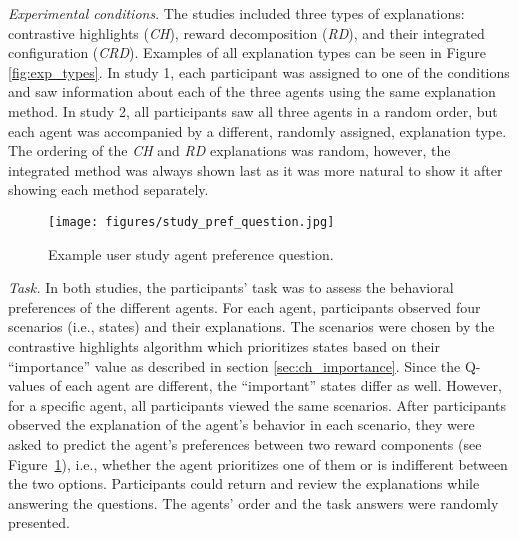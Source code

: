 \documentclass{ecai}
\begin{document}
\emph{Experimental conditions}. The studies included three types of explanations:  contrastive highlights (\textit{CH}), reward decomposition (\textit{RD}), and their integrated configuration (\textit{CRD}). Examples of all explanation types can be seen in Figure \ref{fig:exp_types}. In study 1, each participant was assigned to one of the conditions and saw information about each of the three agents using the same explanation method. 
In study 2, all participants saw all three agents in a random order, but each agent was accompanied by a different, randomly assigned, explanation type. The ordering of the \textit{CH} and \textit{RD} explanations was random, however, the integrated method was always shown last as it was more natural to show it after showing each method separately.

\begin{figure}[t]
\centering
\texttt{[image: figures/study\_pref\_question.jpg]}
\caption{Example user study agent preference question.}
\label{fig:study_pref_question}
\end{figure}


\emph{Task.} 
In both studies, the participants' task was to assess the behavioral preferences of the different agents.
For each agent, participants observed four scenarios (i.e., states) and their explanations. The scenarios were chosen by the contrastive highlights algorithm which prioritizes states based on their ``importance'' value as described in section \ref{sec:ch_importance}. Since the Q-values of each agent are different, the ``important'' states differ as well. However, for a specific agent, all participants viewed the same scenarios. After participants observed the explanation of the agent's behavior in each scenario, they were asked to predict the agent’s preferences between two reward components (see Figure~\ref{fig:study_pref_question}), i.e., whether the agent prioritizes one of them or is indifferent between the two options. Participants could return and review the explanations while answering the questions.
The agents' order and the task answers were randomly presented. 
\end{document}
